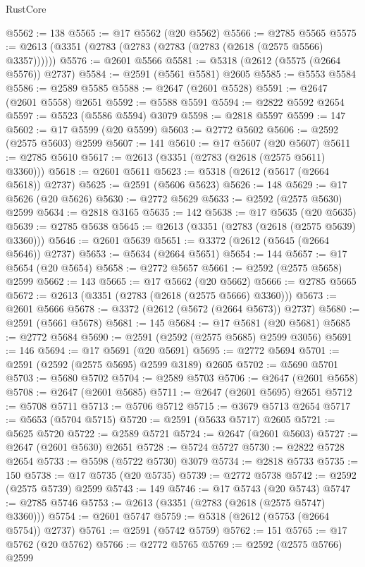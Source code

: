 \begin{lexlean}{RustCore}
\begin{coremodule}
@5562 := 138
@5565 := @17 @5562 (@20 @5562)
@5566 := @2785 @5565
@5575 := @2613 (@3351 (@2783 (@2783 (@2783 (@2783 (@2618 (@2575 @5566) @3357))))))
@5576 := @2601 @5566
@5581 := @5318 (@2612 (@5575 (@2664 @5576)) @2737)
@5584 := @2591 (@5561 @5581) @2605
@5585 := @5553 @5584
@5586 := @2589 @5585
@5588 := @2647 (@2601 @5528)
@5591 := @2647 (@2601 @5558) @2651
@5592 := @5588 @5591
@5594 := @2822 @5592 @2654
@5597 := @5523 (@5586 @5594) @3079
@5598 := @2818 @5597
@5599 := 147
@5602 := @17 @5599 (@20 @5599)
@5603 := @2772 @5602
@5606 := @2592 (@2575 @5603) @2599
@5607 := 141
@5610 := @17 @5607 (@20 @5607)
@5611 := @2785 @5610
@5617 := @2613 (@3351 (@2783 (@2618 (@2575 @5611) @3360)))
@5618 := @2601 @5611
@5623 := @5318 (@2612 (@5617 (@2664 @5618)) @2737)
@5625 := @2591 (@5606 @5623)
@5626 := 148
@5629 := @17 @5626 (@20 @5626)
@5630 := @2772 @5629
@5633 := @2592 (@2575 @5630) @2599
@5634 := @2818 @3165
@5635 := 142
@5638 := @17 @5635 (@20 @5635)
@5639 := @2785 @5638
@5645 := @2613 (@3351 (@2783 (@2618 (@2575 @5639) @3360)))
@5646 := @2601 @5639
@5651 := @3372 (@2612 (@5645 (@2664 @5646)) @2737)
@5653 := @5634 (@2664 @5651)
@5654 := 144
@5657 := @17 @5654 (@20 @5654)
@5658 := @2772 @5657
@5661 := @2592 (@2575 @5658) @2599
@5662 := 143
@5665 := @17 @5662 (@20 @5662)
@5666 := @2785 @5665
@5672 := @2613 (@3351 (@2783 (@2618 (@2575 @5666) @3360)))
@5673 := @2601 @5666
@5678 := @3372 (@2612 (@5672 (@2664 @5673)) @2737)
@5680 := @2591 (@5661 @5678)
@5681 := 145
@5684 := @17 @5681 (@20 @5681)
@5685 := @2772 @5684
@5690 := @2591 (@2592 (@2575 @5685) @2599 @3056)
@5691 := 146
@5694 := @17 @5691 (@20 @5691)
@5695 := @2772 @5694
@5701 := @2591 (@2592 (@2575 @5695) @2599 @3189) @2605
@5702 := @5690 @5701
@5703 := @5680 @5702
@5704 := @2589 @5703
@5706 := @2647 (@2601 @5658)
@5708 := @2647 (@2601 @5685)
@5711 := @2647 (@2601 @5695) @2651
@5712 := @5708 @5711
@5713 := @5706 @5712
@5715 := @3679 @5713 @2654
@5717 := @5653 (@5704 @5715)
@5720 := @2591 (@5633 @5717) @2605
@5721 := @5625 @5720
@5722 := @2589 @5721
@5724 := @2647 (@2601 @5603)
@5727 := @2647 (@2601 @5630) @2651
@5728 := @5724 @5727
@5730 := @2822 @5728 @2654
@5733 := @5598 (@5722 @5730) @3079
@5734 := @2818 @5733
@5735 := 150
@5738 := @17 @5735 (@20 @5735)
@5739 := @2772 @5738
@5742 := @2592 (@2575 @5739) @2599
@5743 := 149
@5746 := @17 @5743 (@20 @5743)
@5747 := @2785 @5746
@5753 := @2613 (@3351 (@2783 (@2618 (@2575 @5747) @3360)))
@5754 := @2601 @5747
@5759 := @5318 (@2612 (@5753 (@2664 @5754)) @2737)
@5761 := @2591 (@5742 @5759)
@5762 := 151
@5765 := @17 @5762 (@20 @5762)
@5766 := @2772 @5765
@5769 := @2592 (@2575 @5766) @2599

\end{coremodule}
\end{lexlean}
